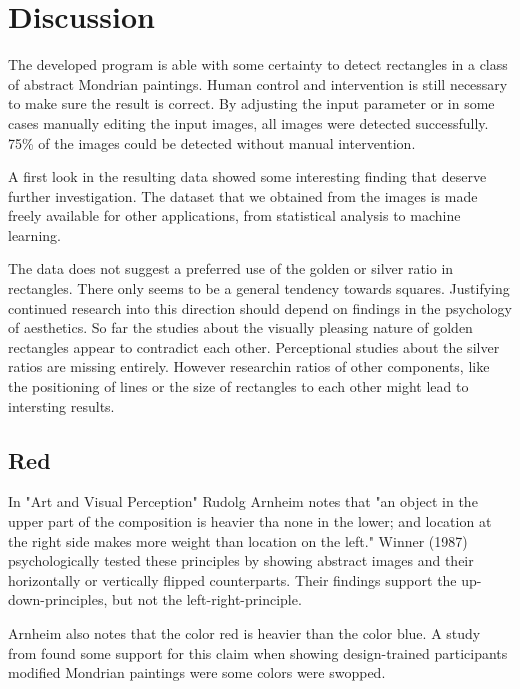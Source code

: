 \section{Discussion} \label{conclusion}

The developed program is able with some certainty to detect rectangles in
a class of abstract Mondrian paintings. Human control and intervention is still
necessary to make sure the result is correct. By adjusting the input parameter
or in some cases manually editing the input images, all images were detected
successfully. 75\% of the images could be detected without manual intervention.

A first look in the resulting data showed some interesting finding that deserve
further investigation. The dataset that we obtained from the images is made
freely available for other applications, from statistical analysis to machine
learning.

The data does not suggest a preferred use of the golden or silver ratio in
rectangles. There only seems to be a general tendency towards squares.
Justifying continued research into this direction should depend on findings in
the psychology of aesthetics. So far the studies about the visually pleasing
nature of golden rectangles appear to contradict each other. Perceptional
studies about the silver ratios are missing entirely. However researchin  ratios
of other components, like the positioning of lines or the size of rectangles to
each other might lead to intersting results.

\subsection{Red}

In "Art and Visual Perception" Rudolg Arnheim \cite{Arnheim1965} notes that "an
object in the upper part of the composition is heavier tha none in the lower;
and location at the right side makes more weight than location on the left."
Winner (1987) \cite{Winner1987} psychologically tested these principles by
showing abstract images and their horizontally or vertically flipped
counterparts. Their findings support the up-down-principles, but not the
left-right-principle.

Arnheim also notes that the color red is heavier than the color blue. A study
from \cite{Locher2005} found some support for this claim when showing
design-trained participants modified Mondrian paintings were some colors were
swopped.

